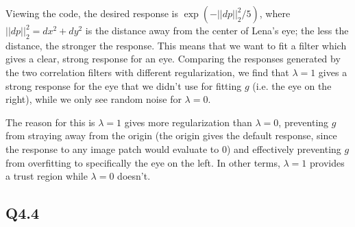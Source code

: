 \documentclass{article} %
\begin{document}
    Viewing the code, the desired response is $\exp (-{\left| \left| dp\right| \right| }_{2}^{2}/5)$, where ${\left| \left| dp\right| \right| }_{2}^{2}=dx^{2}+dy^{2}$ is the distance away from the center of Lena's eye; the less the distance, the stronger the response. This means that we want to fit a filter which gives a clear, strong response for an eye. Comparing the responses generated by the two correlation filters with different regularization, we find that $\lambda =1$ gives a strong response for the eye that we didn’t use for fitting $g$ (i.e. the eye on the right), while we only see random noise for $\lambda =0$.
    \medskip

    The reason for this is $\lambda =1$ gives more regularization than $\lambda =0$, preventing $g$ from straying away from the origin (the origin gives the default response, since the response to any image patch would evaluate to 0) and effectively preventing $g$ from overfitting to specifically the eye on the left. In other terms, $\lambda =1$ provides a trust region while $\lambda =0$ doesn’t.

    \subsection*{Q4.4}
\end{document}
